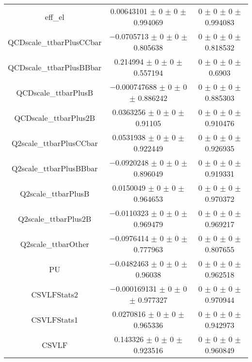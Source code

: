 \begin{table}
\begin{tabular}{ccc}
eff\_el 	& \num{0.00643101} $\pm$ \num{0} $\pm$ \num{0} $\pm$ \num{0.994069} 	& \num{0} $\pm$ \num{0} $\pm$ \num{0} $\pm$ \num{0.994083}\\
QCDscale\_ttbarPlusCCbar 	& \num{-0.0705713} $\pm$ \num{0} $\pm$ \num{0} $\pm$ \num{0.805638} 	& \num{0} $\pm$ \num{0} $\pm$ \num{0} $\pm$ \num{0.818532}\\
QCDscale\_ttbarPlusBBbar 	& \num{0.214994} $\pm$ \num{0} $\pm$ \num{0} $\pm$ \num{0.557194} 	& \num{0} $\pm$ \num{0} $\pm$ \num{0} $\pm$ \num{0.6903}\\
QCDscale\_ttbarPlusB 	& \num{-0.000747688} $\pm$ \num{0} $\pm$ \num{0} $\pm$ \num{0.886242} 	& \num{0} $\pm$ \num{0} $\pm$ \num{0} $\pm$ \num{0.885303}\\
QCDscale\_ttbarPlus2B 	& \num{0.0363256} $\pm$ \num{0} $\pm$ \num{0} $\pm$ \num{0.91105} 	& \num{0} $\pm$ \num{0} $\pm$ \num{0} $\pm$ \num{0.910476}\\
Q2scale\_ttbarPlusCCbar 	& \num{0.0531938} $\pm$ \num{0} $\pm$ \num{0} $\pm$ \num{0.922449} 	& \num{0} $\pm$ \num{0} $\pm$ \num{0} $\pm$ \num{0.926935}\\
Q2scale\_ttbarPlusBBbar 	& \num{-0.0920248} $\pm$ \num{0} $\pm$ \num{0} $\pm$ \num{0.896049} 	& \num{0} $\pm$ \num{0} $\pm$ \num{0} $\pm$ \num{0.919331}\\
Q2scale\_ttbarPlusB 	& \num{0.0150049} $\pm$ \num{0} $\pm$ \num{0} $\pm$ \num{0.964653} 	& \num{0} $\pm$ \num{0} $\pm$ \num{0} $\pm$ \num{0.970372}\\
Q2scale\_ttbarPlus2B 	& \num{-0.0110323} $\pm$ \num{0} $\pm$ \num{0} $\pm$ \num{0.969479} 	& \num{0} $\pm$ \num{0} $\pm$ \num{0} $\pm$ \num{0.969217}\\
Q2scale\_ttbarOther 	& \num{-0.0976414} $\pm$ \num{0} $\pm$ \num{0} $\pm$ \num{0.777963} 	& \num{0} $\pm$ \num{0} $\pm$ \num{0} $\pm$ \num{0.807655}\\
PU 	& \num{-0.0482463} $\pm$ \num{0} $\pm$ \num{0} $\pm$ \num{0.96038} 	& \num{0} $\pm$ \num{0} $\pm$ \num{0} $\pm$ \num{0.962518}\\
CSVLFStats2 	& \num{-0.000169131} $\pm$ \num{0} $\pm$ \num{0} $\pm$ \num{0.977327} 	& \num{0} $\pm$ \num{0} $\pm$ \num{0} $\pm$ \num{0.970944}\\
CSVLFStats1 	& \num{0.0270816} $\pm$ \num{0} $\pm$ \num{0} $\pm$ \num{0.965336} 	& \num{0} $\pm$ \num{0} $\pm$ \num{0} $\pm$ \num{0.942973}\\
CSVLF 	& \num{0.143326} $\pm$ \num{0} $\pm$ \num{0} $\pm$ \num{0.923516} 	& \num{0} $\pm$ \num{0} $\pm$ \num{0} $\pm$ \num{0.960849}\\

\end{tabular}
\end{table}
